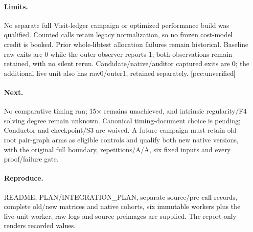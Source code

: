 \documentclass[10pt,a4paper]{article}
\begin{document}
\paragraph{Limits.} No separate full Visit-ledger campaign or optimized performance build was qualified. Counted calls retain legacy normalization, so no frozen cost-model credit is booked. Prior whole-libtest allocation failures remain historical. Baseline raw exits are 0 while the outer observer reports 1; both observations remain retained, with no silent rerun. Candidate/native/auditor captured exits are 0; the additional live unit also has raw0/outer1, retained separately. [pcc:unverified]
\paragraph{Next.} No comparative timing ran; 15$\times$ remains unachieved, and intrinsic regularity/F4 solving degree remain unknown. Canonical timing-document choice is pending; Conductor and checkpoint/S3 are waived. A future campaign must retain old root pair-graph arms as eligible controls and qualify both new native versions, with the original full boundary, repetitions/A/A, six fixed inputs and every proof/failure gate.
\paragraph{Reproduce.} README, PLAN/INTEGRATION\_PLAN, separate source/pre-call records, complete old/new matrices and native cohorts, six immutable workers plus the live-unit worker, raw logs and source preimages are supplied. The report only renders recorded values.
\end{document}
